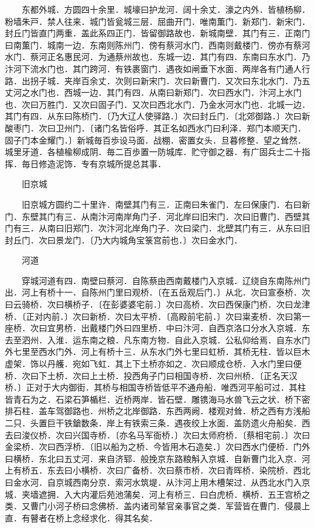 　　东都外城．方圆四十余里．城壕曰护龙河．阔十余丈．濠之内外．皆植杨柳．粉墙朱戸．禁人往来．城门皆瓮城三层．屈曲开门．唯南薫门．新郑门．新宋门．封丘门皆直门两重．盖此系四正门．皆留御路故也．新城南壁．其门有三．正南门曰南薫门．城南一边．东南则陈州门．傍有蔡河水门．西南则戴楼门．傍亦有蔡河水门．蔡河正名惠民河．为通蔡州故也．东城一边．其门有四．东南曰东水门．乃汴河下流水门也．其门跨河．有铁裹窗门．遇夜如闸垂下水面．两岸各有门通人行路．出拐子城．夹岸百余丈．次则曰新宋门．次曰新曹门．又次曰东北水门．乃五丈河之水门也．西城一边．其门有四．从南曰新郑门．次曰西水门．汴河上水门也．次曰万胜门．又次曰固子门．又次曰西北水门．乃金水河水门也．北城一边．其门有四．从东曰陈桥门．〔乃大辽人使驿路．〕次曰封丘门．〔北郊御路．〕次曰新酸枣门．次曰卫州门．〔诸门名皆俗呼．其正名如西水门曰利泽．郑门本顺天门．固子门本金耀门．〕新城毎百歩设马面．战棚．密置女头．旦暮修整．望之耸然．城里牙道．各植楡柳成阴．毎二百歩置一防城库．贮守御之器．有广固兵士二十指挥．毎日修造泥饰．专有京城所提总其事．

　　旧京城

　　旧京城方圆约二十里许．南壁其门有三．正南曰朱雀门．左曰保康门．右曰新门．东壁其门有三．从南汴河南岸角门子．河北岸曰旧宋门．次曰旧曹门．西壁其门有三．从南曰旧郑门．次汴河北岸角门子．次曰梁门．北壁其门有三．从东曰旧封丘门．次曰景龙门．〔乃大内城角宝箓宫前也．〕次曰金水门．

　　河道

　　穿城河道有四．南壁曰蔡河．自陈蔡由西南戴楼门入京城．辽绕自东南陈州门出．河上有桥十一．自陈州门里曰观桥．〔在五岳观后门．〕从北．次曰宣泰桥．次曰云骑桥．次曰横桥子．〔在彭婆婆宅前．〕次曰高桥．次曰西保康门桥．次曰龙津桥．〔正对内前．〕次曰新桥．次曰太平桥．〔高殿前宅前．〕次曰粜麦桥．次曰第一座桥．次曰宜男桥．出戴楼门外曰四里桥．中曰汴河．自西京洛口分水入京城．东去至泗州．入淮．运东南之粮．凡东南方物．自此入京城．公私仰给焉．自东水门外七里至西水门外．河上有桥十三．从东水门外七里曰虹桥．其桥无柱．皆以巨木虚架．饰以丹艧．宛如飞虹．其上下土桥亦如之．次曰顺成仓桥．入水门里曰便桥．次曰下土桥．次曰上土桥．投西角子门曰相国寺桥．次曰州桥．〔正名天汉桥．〕正对于大内御街．其桥与相国寺桥皆低平不通舟船．唯西河平船可过．其柱皆青石为之．石梁石笋楯栏．近桥两岸．皆石壁．雕镌海马水兽飞云之状．桥下密排石柱．盖车驾御路也．州桥之北岸御路．东西两阙．楼观对耸．桥之西有方浅船二只．头置巨干铁鎗数条．岸上有铁索三条．遇夜绞上水面．盖防遗火舟船矣．西去曰浚仪桥．次曰兴国寺桥．〔亦名马军衙桥．〕次曰太师府桥．〔蔡相宅前．〕次曰金梁桥．次曰西浮桥．〔旧以船为之桥．今皆用木石造矣．〕次曰西水门便桥．门外曰横桥．东北曰五丈河．来自济郓．般挽京东路粮斛入京城．自新曹门北入京．河上有桥五．东去曰小横桥．次曰广备桥．次曰蔡市桥．次曰青晖桥．染院桥．西北曰金水河．自京城西南分京．索河水筑堤．从汴河上用木槽架过．从西北水门入京城．夹墙遮拥．入大内灌后苑池蒲矣．河上有桥三．曰白虎桥．横桥．五王宫桥之类．又曹门小河子桥曰念佛桥．盖内诸司辇官亲事官之类．军营皆在曹门．侵晨上直．有瞽者在桥上念经求化．得其名矣．

